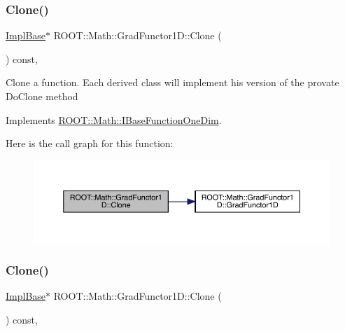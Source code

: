 \subsubsection{\texorpdfstring{Clone()}{Clone()}\hspace{0.1cm}{\footnotesize\ttfamily [1/2]}}
{\footnotesize\ttfamily \mbox{\hyperlink{classROOT_1_1Math_1_1GradFunctor1D_a16b436a0d100aa6c16ee66961c4f5b97}{Impl\+Base}}$\ast$ R\+O\+O\+T\+::\+Math\+::\+Grad\+Functor1\+D\+::\+Clone (\begin{DoxyParamCaption}{ }\end{DoxyParamCaption}) const\hspace{0.3cm}{\ttfamily [inline]}, {\ttfamily [virtual]}}

Clone a function. Each derived class will implement his version of the provate Do\+Clone method 

Implements \mbox{\hyperlink{classROOT_1_1Math_1_1IBaseFunctionOneDim_a656dbb4dfc43e8d1566442bfb1a717fd}{R\+O\+O\+T\+::\+Math\+::\+I\+Base\+Function\+One\+Dim}}.

Here is the call graph for this function\+:
\nopagebreak
\begin{figure}[H]
\begin{center}
\leavevmode
\includegraphics[width=350pt]{d3/d76/classROOT_1_1Math_1_1GradFunctor1D_ab8280aaf240a374fb7a67808d858af79_cgraph}
\end{center}
\end{figure}
\mbox{\label{classROOT_1_1Math_1_1GradFunctor1D_ab8280aaf240a374fb7a67808d858af79}} 
\subsubsection{\texorpdfstring{Clone()}{Clone()}\hspace{0.1cm}{\footnotesize\ttfamily [2/2]}}
{\footnotesize\ttfamily \mbox{\hyperlink{classROOT_1_1Math_1_1GradFunctor1D_a16b436a0d100aa6c16ee66961c4f5b97}{Impl\+Base}}$\ast$ R\+O\+O\+T\+::\+Math\+::\+Grad\+Functor1\+D\+::\+Clone (\begin{DoxyParamCaption}{ }\end{DoxyParamCaption}) const\hspace{0.3cm}{\ttfamily [inline]}, {\ttfamily [virtual]}}

